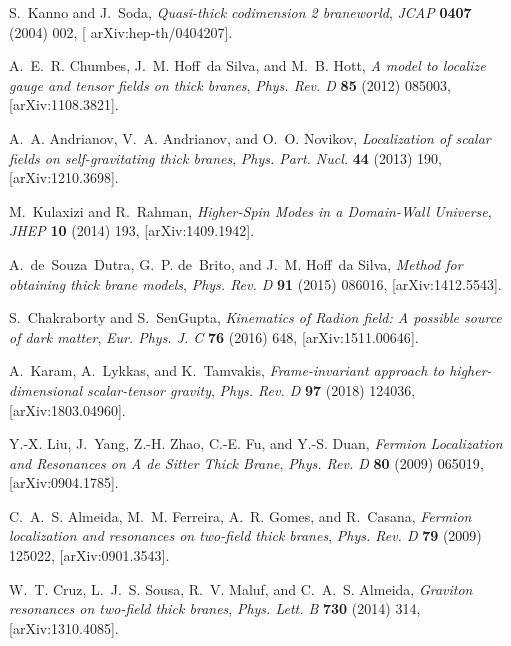 \begin{thebibliography}{99}
S.~Kanno and J.~Soda, \emph{{Quasi-thick codimension 2 braneworld}},
  {\emph{JCAP} {\bfseries
  0407} (2004) 002}, [{{\ttfamily
  arXiv:hep-th/0404207}}].

A.~E.~R. Chumbes, J.~M. Hoff~da Silva, and M.~B. Hott, \emph{{A model to
  localize gauge and tensor fields on thick branes}},
  {\emph{Phys. Rev. D}
  {\bfseries 85} (2012) 085003},
  [{{\ttfamily arXiv:1108.3821}}].

A.~A. Andrianov, V.~A. Andrianov, and O.~O. Novikov, \emph{{Localization of
  scalar fields on self-gravitating thick branes}},
 {\emph{Phys. Part. Nucl.}
  {\bfseries 44} (2013) 190},
  [{{\ttfamily arXiv:1210.3698}}].

M.~Kulaxizi and R.~Rahman, \emph{{Higher-Spin Modes in a Domain-Wall
  Universe}}, {\emph{JHEP}
  {\bfseries 10} (2014) 193},
  [{{\ttfamily arXiv:1409.1942}}].

A.~de~Souza~Dutra, G.~P. de~Brito, and J.~M. Hoff~da Silva, \emph{{Method for
  obtaining thick brane models}},
  {\emph{Phys. Rev. D}
  {\bfseries 91} (2015) 086016},
  [{{\ttfamily arXiv:1412.5543}}].


S.~Chakraborty and S.~SenGupta,
\emph{{Kinematics of Radion field: A possible source of dark matter}},
{\emph{Eur. Phys. J. C} {\bfseries 76} (2016) 648},
[{{\ttfamily arXiv:1511.00646}}].

A.~Karam, A.~Lykkas, and K.~Tamvakis,
\emph{{Frame-invariant approach to higher-dimensional scalar-tensor gravity}},
{\emph{Phys. Rev. D} {\bfseries 97} (2018) 124036},
[{{\ttfamily arXiv:1803.04960}}].







Y.-X. Liu, J.~Yang, Z.-H. Zhao, C.-E. Fu, and Y.-S. Duan,
\emph{{Fermion Localization and Resonances on A de Sitter Thick Brane}},
 {\emph{Phys. Rev. D} {\bfseries 80} (2009) 065019},
  [{{\ttfamily arXiv:0904.1785}}].


C.~A.~S. Almeida, M.~M. Ferreira, A.~R. Gomes, and R.~Casana,
  \emph{{Fermion localization and resonances on two-field thick branes}},
  {\emph{Phys. Rev. D}
  {\bfseries 79} (2009) 125022},
  [{{\ttfamily arXiv:0901.3543}}].

W.~T. Cruz, L.~J.~S. Sousa, R.~V. Maluf, and C.~A.~S. Almeida, \emph{{Graviton
  resonances on two-field thick branes}},
  {\emph{Phys. Lett. B}
  {\bfseries 730} (2014) 314},
  [{{\ttfamily arXiv:1310.4085}}].


\end{thebibliography}
